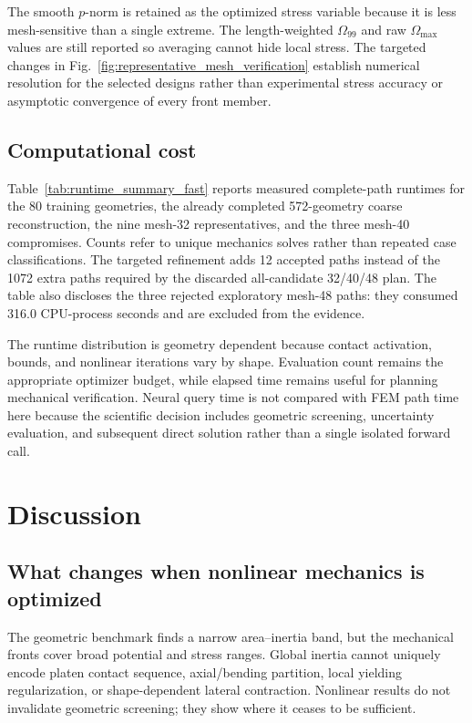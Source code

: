 \documentclass[11pt]{article}
\newcommand{\Ommax}{\Omega_{\max}}
\begin{document}
The smooth $p$-norm is retained as the optimized stress variable because it is less mesh-sensitive than a single extreme. The length-weighted $\Omega_{99}$ and raw $\Ommax$ values are still reported so averaging cannot hide local stress. The targeted changes in Fig.~\ref{fig:representative_mesh_verification} establish numerical resolution for the selected designs rather than experimental stress accuracy or asymptotic convergence of every front member.

\subsection{Computational cost}

Table~\ref{tab:runtime_summary_fast} reports measured complete-path runtimes for the 80 training geometries, the already completed 572-geometry coarse reconstruction, the nine mesh-32 representatives, and the three mesh-40 compromises. Counts refer to unique mechanics solves rather than repeated case classifications. The targeted refinement adds 12 accepted paths instead of the 1072 extra paths required by the discarded all-candidate 32/40/48 plan. The table also discloses the three rejected exploratory mesh-48 paths: they consumed 316.0 CPU-process seconds and are excluded from the evidence.



The runtime distribution is geometry dependent because contact activation, bounds, and nonlinear iterations vary by shape. Evaluation count remains the appropriate optimizer budget, while elapsed time remains useful for planning mechanical verification. Neural query time is not compared with FEM path time here because the scientific decision includes geometric screening, uncertainty evaluation, and subsequent direct solution rather than a single isolated forward call.

\FloatBarrier
\section{Discussion}

\subsection{What changes when nonlinear mechanics is optimized}

The geometric benchmark finds a narrow area--inertia band, but the mechanical fronts cover broad potential and stress ranges. Global inertia cannot uniquely encode platen contact sequence, axial/bending partition, local yielding regularization, or shape-dependent lateral contraction. Nonlinear results do not invalidate geometric screening; they show where it ceases to be sufficient.
\end{document}

